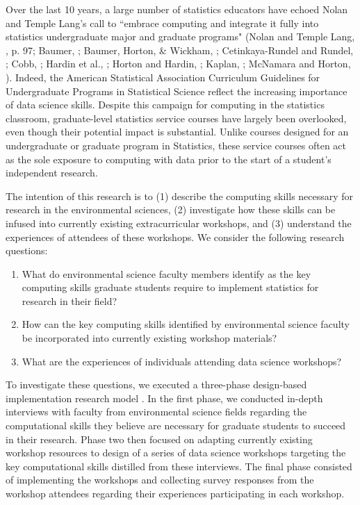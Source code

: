 \documentclass[12pt]{article}
\begin{document}
\quad Over the last 10 years, a large number of statistics educators have echoed
Nolan and Temple Lang's call to ``embrace computing and integrate it fully into 
statistics undergraduate major and graduate programs" (Nolan and Temple Lang, 
\citeyear{nolan}, p. 97; Baumer, \citeyear{baumer_datascience}; Baumer, Horton, 
\& Wickham, \citeyear{horton_takingachance}; Cetinkaya-Rundel and Rundel, 
\citeyear{mine}; Cobb, \citeyear{cobb}; Hardin et al., \citeyear{hardin}; Horton
and Hardin, \citeyear{horton_thinkwithdata}; Kaplan, \citeyear{kaplan}; McNamara
and Horton, \citeyear{mcnamara}). Indeed, the American Statistical Association 
Curriculum Guidelines for Undergraduate Programs in Statistical Science 
\citep{asa} reflect the increasing importance of data science skills. Despite 
this campaign for computing in the statistics classroom, graduate-level 
statistics service courses have largely been overlooked, even though their 
potential impact is substantial. Unlike courses designed for an undergraduate or
graduate program in Statistics, these service courses often act as the sole 
exposure to computing with data prior to the start of a student's independent 
research. 

\quad The intention of this research is to (1) describe the computing skills 
necessary for research in the environmental sciences, (2) investigate how these 
skills can be infused into currently existing extracurricular workshops, and (3)
understand the experiences of attendees of these workshops. We consider the 
following research questions:
\begin{enumerate}
    \item What do environmental science faculty members identify as the key 
    computing skills graduate students require to implement statistics for 
    research in their field?   
    \item How can the key computing skills identified by environmental science 
    faculty be incorporated into currently existing workshop materials?  
    \item What are the experiences of individuals attending data science 
    workshops?  
\end{enumerate}

\quad To investigate these questions, we executed a three-phase design-based 
implementation research model \citep{penuel}. In the first phase, we conducted 
in-depth interviews with faculty from environmental science fields regarding the
computational skills they believe are necessary for graduate students to succeed
in their research. Phase two then focused on adapting currently existing 
workshop resources to design of a series of data science workshops targeting the
key computational skills distilled from these interviews. The final phase 
consisted of implementing the workshops and collecting survey responses from the
workshop attendees regarding their experiences participating in each workshop.  
\end{document}
